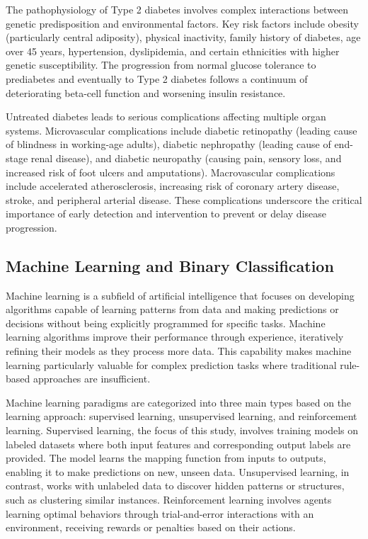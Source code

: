 The pathophysiology of Type 2 diabetes involves complex interactions between genetic predisposition and environmental factors. Key risk factors include obesity (particularly central adiposity), physical inactivity, family history of diabetes, age over 45 years, hypertension, dyslipidemia, and certain ethnicities with higher genetic susceptibility. The progression from normal glucose tolerance to prediabetes and eventually to Type 2 diabetes follows a continuum of deteriorating beta-cell function and worsening insulin resistance.

Untreated diabetes leads to serious complications affecting multiple organ systems. Microvascular complications include diabetic retinopathy (leading cause of blindness in working-age adults), diabetic nephropathy (leading cause of end-stage renal disease), and diabetic neuropathy (causing pain, sensory loss, and increased risk of foot ulcers and amputations). Macrovascular complications include accelerated atherosclerosis, increasing risk of coronary artery disease, stroke, and peripheral arterial disease. These complications underscore the critical importance of early detection and intervention to prevent or delay disease progression.

\subsection{Machine Learning and Binary Classification}

Machine learning is a subfield of artificial intelligence that focuses on developing algorithms capable of learning patterns from data and making predictions or decisions without being explicitly programmed for specific tasks. Machine learning algorithms improve their performance through experience, iteratively refining their models as they process more data. This capability makes machine learning particularly valuable for complex prediction tasks where traditional rule-based approaches are insufficient.

Machine learning paradigms are categorized into three main types based on the learning approach: supervised learning, unsupervised learning, and reinforcement learning. Supervised learning, the focus of this study, involves training models on labeled datasets where both input features and corresponding output labels are provided. The model learns the mapping function from inputs to outputs, enabling it to make predictions on new, unseen data. Unsupervised learning, in contrast, works with unlabeled data to discover hidden patterns or structures, such as clustering similar instances. Reinforcement learning involves agents learning optimal behaviors through trial-and-error interactions with an environment, receiving rewards or penalties based on their actions.


